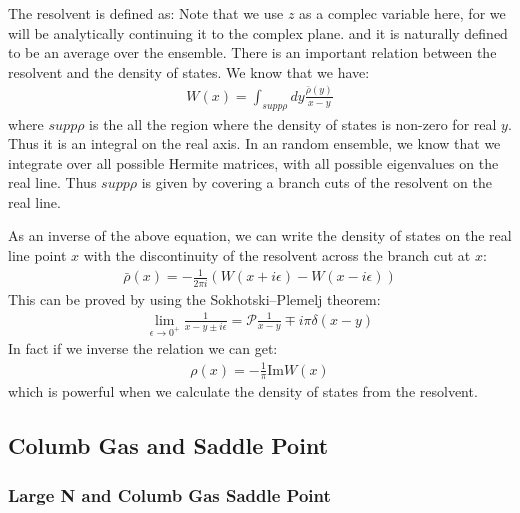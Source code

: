 The resolvent is defined as:
Note that we use $ z $ as a complec variable here, for we will be analytically continuing it to the complex plane. and it is naturally defined to be an average over the ensemble. 
There is an important relation between the resolvent and the density of states. We know that we have:
\begin{align}
W(x) = \int_{supp \rho} dy \displaystyle\frac{\bar{\rho}(y)}{x - y}
\end{align}
where $ supp \rho $ is the all the region where the density of states is non-zero for real $ y $. Thus it is an integral on the real axis. In an random ensemble, we know that we integrate over all possible Hermite matrices, with all possible eigenvalues on the real line. Thus $ supp \rho $ is given by covering a branch cuts of the resolvent on the real line. 

As an inverse of the above equation, we can write the density of states on the real line point $ x $ with the discontinuity of the resolvent across the branch cut at $ x $:
\begin{align}
  \bar{\rho}(x) = -\displaystyle\frac{1}{2\pi i} \left( W(x + i\epsilon) - W(x - i\epsilon) \right)
\end{align}
This can be proved by using the Sokhotski–Plemelj theorem:
\begin{align}
  \lim_{\epsilon\to 0^+} \displaystyle\frac{1}{x - y \pm i\epsilon} = \mathcal{P}\displaystyle\frac{1}{x - y} \mp i\pi \delta(x - y)
\end{align}
In fact if we inverse the relation we can get:
\begin{align}
  \rho(x)=-\frac{1}{\pi}\mathrm{Im}W(x)
\end{align}
which is powerful when we calculate the density of states from the resolvent.


\subsection{Columb Gas and Saddle Point}


\subsubsection{Large N and Columb Gas Saddle Point}

